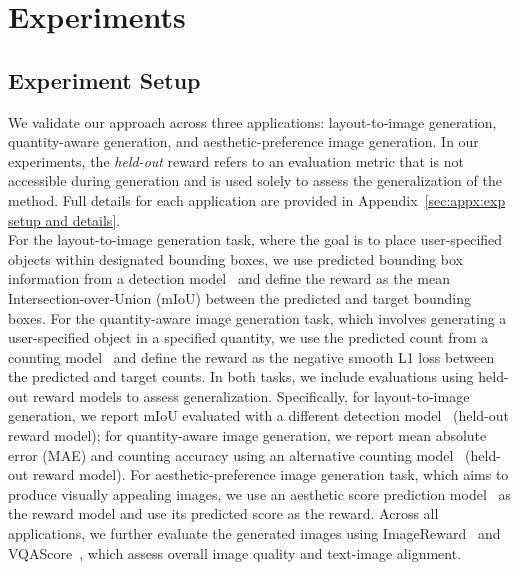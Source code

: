 \vspace{-0.1cm}
\section{Experiments}
\label{sec:experiments}
\vspace{-0.1cm}
\subsection{Experiment Setup}
\label{sec:experiments:setup}
We validate our approach across three applications: layout-to-image generation, quantity-aware generation, and aesthetic-preference image generation. 
In our experiments, the \emph{held-out} reward refers to an evaluation metric that is not accessible during generation and is used solely to assess the generalization of the method. 
Full details for each application are provided in Appendix~\ref{sec:appx:exp setup and details}.\\
For the layout-to-image generation task, where the goal is to place user-specified objects within designated bounding boxes, we use predicted bounding box information from a detection model~\cite{liu2023grounding} and define the reward as the mean Intersection-over-Union (mIoU) between the predicted and target bounding boxes.
For the quantity-aware image generation task, which involves generating a user-specified object in a specified quantity, we use the predicted count from a counting model~\cite{qian2025t2icount} and define the reward as the negative smooth L1 loss between the predicted and target counts. 
In both tasks, we include evaluations using held-out reward models to assess generalization. Specifically, for layout-to-image generation, we report mIoU evaluated with a different detection model~\cite{Hou2024saliencedetr} (held-out reward model); for quantity-aware image generation, we report mean absolute error (MAE) and counting accuracy using an alternative counting model~\cite{AminiNaieni2024countgd} (held-out reward model). 
For aesthetic-preference image generation task, which aims to produce visually appealing images, we use an aesthetic score prediction model~\cite{schuhmann2022aesthetic} as the reward model and use its predicted score as the reward.
Across all applications, we further evaluate the generated images using ImageReward~\cite{xu2023imagereward} and VQAScore~\cite{lin2024vqa}, which assess overall image quality and text-image alignment. 
